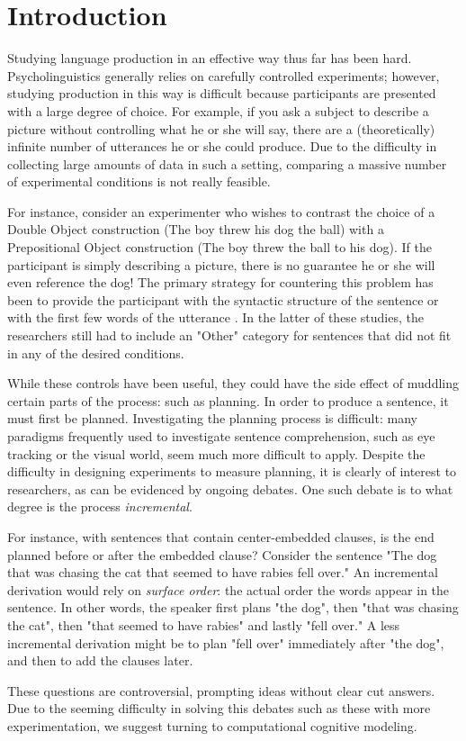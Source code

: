 \section{Introduction}
 Studying language production in an effective way thus far has been hard. Psycholinguistics generally relies on carefully controlled experiments; however, studying production in this way is difficult because participants are presented with a large degree of choice. For example, if you ask a subject to describe a picture without controlling what he or she will say, there are a (theoretically) infinite number of utterances he or she could produce. Due to the difficulty in collecting large amounts of data in such a setting, comparing a massive number of experimental conditions is not really feasible. 
 
 For instance, consider an experimenter who wishes to contrast the choice of a Double Object construction (The boy threw his dog the ball) with a Prepositional Object construction (The boy threw the ball to his dog). If the participant is simply describing a picture, there is no guarantee he or she will even reference the dog! The primary strategy for countering this problem has been to provide the participant with the syntactic structure of the sentence \citep{sums-incr} or with the first few words of the utterance \citep{prod-exp}. In the latter of these studies, the researchers still had to include an "Other" category for sentences that did not fit in any of the desired conditions. 
 
 While these controls have been useful, they could have the side effect of muddling certain parts of the process: such as planning. In order to produce a sentence, it must first be planned. Investigating the planning process is difficult: many paradigms frequently used to investigate sentence comprehension, such as eye tracking or the visual world, seem much more difficult to apply. Despite the difficulty in designing experiments to measure planning, it is clearly of interest to researchers, as can be evidenced by ongoing debates. One such debate is to what degree is the process \emph{incremental}. 
 
 For instance, with sentences that contain center-embedded clauses, is the end planned before or after the embedded clause? Consider the sentence "The dog that was chasing the cat that seemed to have rabies fell over." An incremental derivation would rely on \emph{surface order}: the actual order the words appear in the sentence. In other words, the speaker first plans "the dog", then "that was chasing the cat", then "that seemed to have rabies" and lastly "fell over." A less incremental derivation might be to plan "fell over" immediately after "the dog", and then to add the clauses later.
 
These questions are controversial, prompting ideas without clear cut answers. Due to the seeming difficulty in solving this debates such as these with more experimentation, we suggest turning to computational cognitive modeling.
 
%
